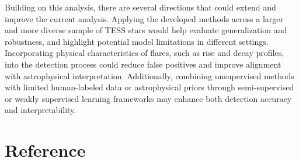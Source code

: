 \documentclass[
]{article}
\begin{document}
Building on this analysis, there are several directions that could extend and improve the current analysis. Applying the developed methods across a larger and more diverse sample of TESS stars would help evaluate generalization and robustness, and highlight potential model limitations in different settings. Incorporating physical characteristics of flares, such as rise and decay profiles, into the detection process could reduce false positives and improve alignment with astrophysical interpretation. Additionally, combining unsupervised methods with limited human-labeled data or astrophysical priors through semi-supervised or weakly supervised learning frameworks may enhance both detection accuracy and interpretability.

\newpage

\section{Reference}\label{reference}
\end{document}
